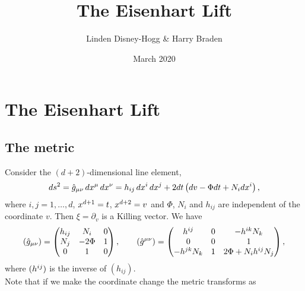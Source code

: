 \documentclass{article}
\title{The Eisenhart Lift}
\author{Linden Disney-Hogg \& Harry Braden}
\date{March 2020}
\begin{document}
\maketitle

\section{The Eisenhart Lift}
\subsection{The metric}
Consider the $(d+2)$-dimensional line element,
\begin{equation}
\label{eislift}
ds^2=\hat g_{\mu\nu}\,dx\sp{\mu}\,dx\sp{\nu}
=h_{ij}\, dx\sp{i}\, dx\sp{j}+2dt \left( dv-\Phi dt+N_i dx\sp{i}\right),
\end{equation}
where $i,j=1,\ldots,d$, $x\sp{d+1}=t$,  $x\sp{d+2}=v$ and $\Phi$, $N_i$ and $h_{ij}$ are independent of the coordinate $v$. Then $\xi = \partial_v$ is a Killing vector. 
We have
$$(\hat{g}_{\mu\nu})=\begin{pmatrix}h_{ij}&N_i&0\\ N_j&-2\Phi&1\\ 0&1&0\end{pmatrix},\qquad
(\hat{g}^{\mu\nu})=\begin{pmatrix}h\sp{ij}&0&-h\sp{ik}N_k\\ 0&0&1\\ -h\sp{jk}N_k &1&2 \Phi+ N_i h\sp{ij} N_j\end{pmatrix},
$$
where $(h\sp{ij})$ is the inverse of $(h_{ij})$. \\
Note that if we make the coordinate change 
the metric transforms as 
\end{document}
